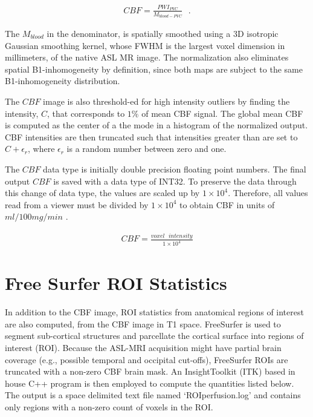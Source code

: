 \documentclass[letterpaper,11pt]{article}
\newcommand{\s}{\text{ }} %
\begin{document}
\begin{align}
CBF = \frac{PWI_{PVC}}{M_{blood-PVC}} \s.
\end{align}

The $M_{blood}$ in the denominator, is spatially smoothed using a 3D isotropic Gaussian smoothing kernel, whose FWHM is the largest voxel dimension in millimeters, of the native ASL MR image. The normalization also eliminates spatial B1-inhomogeneity by definition, since both maps are subject to the same B1-inhomogeneity distribution. 

The $CBF$ image is also threshold-ed for high intensity outliers by finding the intensity, $C$, that corresponds to $1\%$ of mean CBF signal. The global mean CBF is computed as the center of a the mode in a histogram of the normalized output. CBF intensities are then truncated such that intensities greater than  are set to $C + \epsilon_r$, where $\epsilon_r$ is a random number between zero and one. 

The $CBF$ data type is initially double precision floating point numbers. The final output $CBF$ is saved with a data type of INT32. To preserve the data through this change of data type, the values are scaled up by $1\times{10}^4$. Therefore, all values read from a viewer must be divided by $1 \times 10^4$ to obtain CBF in units of $ml/100mg/min$ .

\begin{align}
\label{eq:outputScale}
CBF = \frac{voxel \s intensity}{1\times{10}^4}
\end{align}

\section*{Free Surfer ROI Statistics}
In addition to the CBF image, ROI statistics from anatomical regions of interest are also computed, from the CBF image in T1 space. FreeSurfer is used to segment sub-cortical structures and parcellate the cortical surface into regions of interest (ROI). Because the ASL-MRI acquisition might have partial brain coverage (e.g., possible temporal and occipital cut-offs), FreeSurfer ROIs are truncated with a non-zero CBF brain mask. An Insight\-Toolkit (ITK) based in house C++ program is then employed to compute the quantities listed below. The output is a space delimited text file named `ROIperfusion.log' and contains only regions with a non-zero count of voxels in the ROI.
\end{document}
